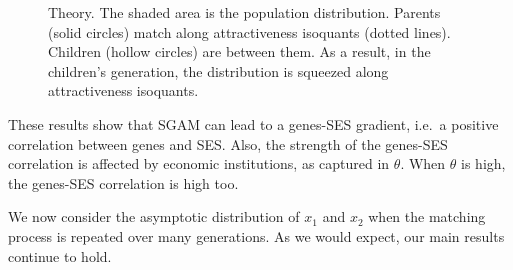 \documentclass[
  12pt,
]{article}
\theoremstyle{definition}
\theoremstyle{definition}
\theoremstyle{definition}
\theoremstyle{definition}
\theoremstyle{remark}
\begin{document}
\begin{figure}

{\centering {}

}

\caption{Theory. The shaded area is the population distribution. Parents (solid circles) match along attractiveness isoquants (dotted lines). Children (hollow circles) are between them. As a result, in the children's generation, the distribution is squeezed along attractiveness isoquants.}\label{fig:pic-intuition}
\end{figure}

These results show that SGAM can lead to a genes-SES gradient, i.e.~a positive
correlation between genes and SES. Also, the strength of the genes-SES
correlation is affected by economic institutions, as captured in \(\theta\).
When \(\theta\) is high, the genes-SES correlation is high too.

We now consider the asymptotic distribution of \(x_1\) and \(x_2\) when the matching
process is repeated over many generations. As we would expect, our main results
continue to hold.
\end{document}
